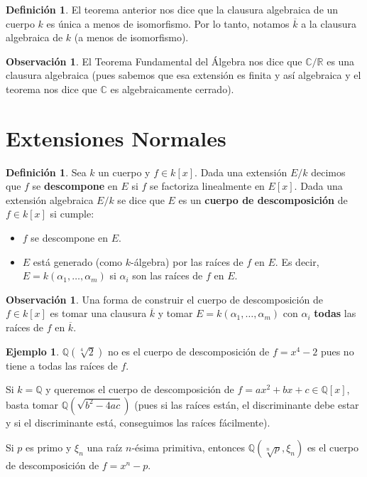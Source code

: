 \documentclass[12pt]{book}
\theoremstyle{definition}
\newtheorem{obs}[teo]{Observación}
\newtheorem{defn}[teo]{Definición}
\newtheorem{ex}[teo]{Ejemplo}
\newcommand{\CC}{\mathbb{C}}
\newcommand{\RR}{\mathbb{R}}      %
\newcommand{\QQ}{\mathbb{Q}}
\begin{document}
\begin{defn}
El teorema anterior nos dice que la clausura algebraica de un cuerpo $k$ es única a menos de isomorfismo. Por lo tanto, notamos $\overline{k}$ a la clausura algebraica de $k$ (a menos de isomorfismo).
\end{defn}

\begin{obs}
El Teorema Fundamental del Álgebra nos dice que $\CC/\RR$ es una clausura algebraica (pues sabemos que esa extensión es finita y así algebraica y el teorema nos dice que $\CC$ es algebraicamente cerrado).
\end{obs}

\section{Extensiones Normales}

\begin{defn}
Sea $k$ un cuerpo y $f\in k[x]$. Dada una extensión $E/k$ decimos que $f$ se \textbf{descompone} en $E$ si $f$ se factoriza linealmente en $E[x]$. Dada una extensión algebraica $E/k$ se dice que $E$ es un \textbf{cuerpo de descomposición} de $f\in k[x]$ si cumple:
\begin{itemize}
\item $f$ se descompone en $E$.
\item $E$ está generado (como $k$-álgebra) por las raíces de $f$ en $E$. Es decir, $E=k(\alpha_1,\ldots ,\alpha_m)$ si $\alpha_i$ son las raíces de $f$ en $E$.
\end{itemize}
\end{defn}

\begin{obs}
Una forma de construir el cuerpo de descomposición de $f\in k[x]$ es tomar una clausura $\overline{k}$ y tomar $E = k(\alpha_1,\ldots , \alpha_m)$ con $\alpha_i$ \textbf{todas} las raíces de $f$ en $\overline{k}$.
\end{obs}

\begin{ex}
$\QQ(\sqrt[4]{2})$ no es el cuerpo de descomposición de $f=x^4 - 2$ pues no tiene a todas las raíces de $f$.

Si $k=\QQ$ y queremos el cuerpo de descomposición de $f=ax^2 + bx+c\in\QQ[x]$, basta tomar $\QQ(\sqrt{b^2 - 4ac})$ (pues si las raíces están, el discriminante debe estar y si el discriminante está, conseguimos las raíces fácilmente).

Si $p$ es primo y $\xi_n$ una raíz $n$-ésima primitiva, entonces $\QQ(\sqrt[n]{p},\xi_n)$ es el cuerpo de descomposición de $f=x^n - p$.
\end{ex}
\end{document}
